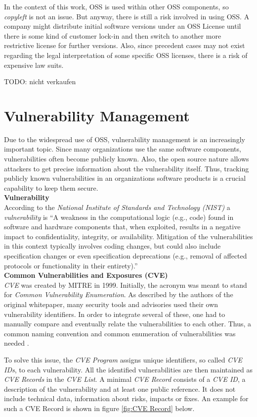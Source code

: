 In the context of this work, OSS is used within other OSS components, so \textit{copyleft} is not an issue. But anyway, there is still a risk involved in using OSS. A company might distribute initial software versions under an OSS License until there is some kind of customer lock-in and then switch to another more restrictive license for further versions. Also, since precedent cases may not exist regarding the legal interpretation of some specific OSS licenses, there is a risk of expensive law suits.

TODO: nicht verkaufen

\section{Vulnerability Management} \label{sec:Vulnerability Management}
Due to the widespread use of OSS, vulnerability management is an increasingly important topic. Since many organizations use the same software components, vulnerabilities often become publicly known. Also, the open source nature allows attackers to get precise information about the vulnerability itself. Thus, tracking publicly known vulnerabilities in an organizations software products is a crucial capability to keep them secure.\\

\noindent
\textbf{Vulnerability}\\
\noindent
According to the \emph{National Institute of Standards and Technology (NIST)} a \emph{vulnerability} is \enquote{A weakness in the computational logic (e.g., code) found in software and hardware components that, when exploited, results in a negative impact to confidentiality, integrity, or availability. Mitigation of the vulnerabilities in this context typically involves coding changes, but could also include specification changes or even specification deprecations (e.g., removal of affected protocols or functionality in their entirety).}\cite{NVDWebsite}\\

\noindent
\textbf{Common Vulnerabilities and Exposures (CVE)}\\
\noindent 
\emph{CVE} was created by MITRE in 1999. Initially, the acronym was meant to stand for \textit{Common Vulnerability Enumeration}. As described by the authors of the original whitepaper, many security tools and advisories used their own vulnerability identifiers. In order to integrate several of these, one had to manually compare and eventually relate the vulnerabilities to each other. Thus, a common naming convention and common enumeration of vulnerabilities was needed \cite{CVEOriginal}.\par
To solve this issue, the \textit{CVE Program} assigns unique identifiers, so called \textit{CVE IDs}, to each vulnerability. All the identified vulnerabilities are then maintained as \textit{CVE Records} in the \textit{CVE List}. A minimal \textit{CVE Record} consists of a \textit{CVE ID}, a description of the vulnerability and at least one public reference. It does not include technical data, information about risks, impacts or fixes. An example for such a CVE Record is shown in figure \ref{fig:CVE Record} below.

